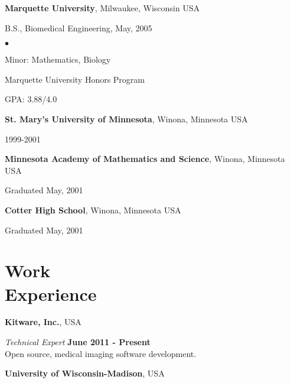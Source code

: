 \documentclass[margin,line]{res}
\newenvironment{list1}{
  \begin{list}{\ding{113}}{%
      \setlength{\itemsep}{0in}
      \setlength{\parsep}{0in} \setlength{\parskip}{0in}
      \setlength{\topsep}{0in} \setlength{\partopsep}{0in}
      \setlength{\leftmargin}{0.17in}}}{\end{list}}
\newenvironment{list2}{
  \begin{list}{$\bullet$}{%
      \setlength{\itemsep}{0in}
      \setlength{\parsep}{0in} \setlength{\parskip}{0in}
      \setlength{\topsep}{0in} \setlength{\partopsep}{0in}
      \setlength{\leftmargin}{0.2in}}}{\end{list}}
\begin{document}
\begin{resume}
{\bf Marquette University}, Milwaukee, Wisconsin USA\\
\vspace*{-.1in}
\begin{list1}
\item[] B.S., Biomedical Engineering,  May, 2005

\begin{list2}
 \vspace*{.05in}
 \item Minor: Mathematics, Biology
 \item Marquette University Honors Program
 \item GPA: 3.88/4.0
\end{list2}
\end{list1}

{\bf St. Mary's University of Minnesota}, Winona, Minnesota USA\\
\vspace*{-.1in}
\begin{list1}
\item[] 1999-2001
\end{list1}


{\bf Minnesota Academy of Mathematics and Science}, Winona, Minnesota USA\\
\vspace*{-.1in}
\begin{list1}
\item[] Graduated May, 2001
\end{list1}

{\bf Cotter High School}, Winona, Minnesota USA\\
\vspace*{-.1in}
\begin{list1}
\item[] Graduated May, 2001
\end{list1}

\section{\sc Work\\ Experience}

{\bf Kitware, Inc.}, USA

\vspace{-.3cm}
{\em Technical Expert} \hfill {\bf June 2011 - Present} \\
Open source, medical imaging software development.

{\bf University of Wisconsin-Madison}, USA


\end{resume}
\end{document}
